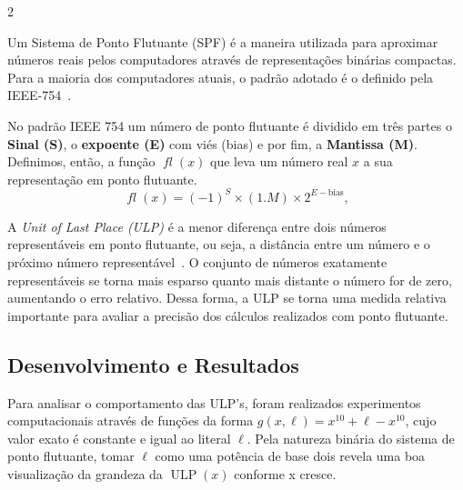 \documentclass[a0,portrait]{a0poster}
\DeclareMathOperator{\ulp}{ULP}
\DeclareMathOperator{\fl}{\textit{fl}}
\begin{document}
\begin{multicols}{2}
  \begin{justify}\setlength{\parindent}{5ex} \indent \par
    Um Sistema de Ponto Flutuante (SPF) é a maneira utilizada para aproximar
    números reais pelos computadores através de representações binárias compactas.
    Para a maioria dos computadores atuais, o padrão adotado é o definido pela
    IEEE-754~\cite{IEEE754}.

    No padrão IEEE 754 um número de ponto flutuante é dividido em três partes o
    \textbf{Sinal (S)}, o \textbf{expoente (E)} com viés (bias) e por fim, a
    \textbf{Mantissa (M)}. Definimos, então, a função $\fl(x)$ que leva um número
    real $x$ a sua representação em ponto flutuante.
    \begin{equation}
      \fl(x) =
      \left(-1\right)^S
      \times
      \left(1.M\right)
      \times
      2^{E - \text{bias}},
      \label{eq:spf}
    \end{equation}

    \hspace*{2.5cm}A \textit{Unit of Last Place (ULP)} é a menor diferença entre dois números
    representáveis em ponto flutuante, ou seja, a distância entre um número e o
    próximo número representável~\cite{kahan2004,muller2005}. O conjunto de números
    exatamente representáveis se torna mais esparso quanto mais distante o número
    for de zero, aumentando o erro relativo. Dessa forma, a ULP se torna uma medida
    relativa importante para avaliar a precisão dos cálculos realizados com ponto
    flutuante.

  \end{justify}
  \vspace{-1cm}
  \color{SaddleBrown}

  \begin{center}
    \section*{Desenvolvimento e Resultados}
  \end{center}
  \color{Black}
  \begin{justify}
    \setlength{\parindent}{5ex} \indent \par
    \vspace{-2cm}

    Para analisar o comportamento das ULP's, foram realizados experimentos
    computacionais através de funções da forma $g(x,\ell) = x^{10} + \ell -
      x^{10}$, cujo valor exato é constante e igual ao literal $\ell$. Pela natureza
    binária do sistema de ponto flutuante, tomar $\ell$ como uma potência de base
    dois revela uma boa visualização da grandeza da $\ulp(x)$ conforme x cresce.


\end{justify}
\end{multicols}
\end{document}
